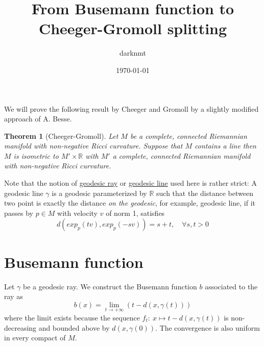 \documentclass[11pt]{article}
\author{darknmt}
\date{\today}
\title{From Busemann function to Cheeger-Gromoll splitting}
\newtheorem{theorem}{Theorem}
\begin{document}
\maketitle
\tableofcontents

\iffalse
\begin{info}
The PDF version of this page can be downloaded by replacing \texttt{html} in the its address by
\texttt{pdf}. 
For example \texttt{/html/sheaf-cohomology.html} should become \texttt{/pdf/sheaf-cohomology.pdf}.
\end{info}
\fi
\iffalse
\begin{info}
This post is a part of the \href{../res/Stage2017.pdf}{memoire of my M1 internship} at I2M. The memoire contains,
needless to say, less errors than this page.
\end{info}
\fi


We will prove the following result by Cheeger and Gromoll by a slightly modified approach of
A. Besse.


\begin{theorem}[Cheeger-Gromoll]
\label{org547c731}
\label{thm:cheeger-gromoll}
Let \(M\) be a complete, connected Riemannian manifold with non-negative Ricci curvature. Suppose
that \(M\) contains a line then \(M\) is isometric to \(M'\times \mathbb{R}\) with \(M'\) a complete,
connected Riemannian manifold with non-negative Ricci curvature.
\end{theorem}

Note that the notion of \uline{geodesic ray} or \uline{geodesic line} used here is rather strict: A geodesic
line \(\gamma\) is a geodesic parameterized by \(\mathbb{R}\) such that the distance between two point is
exactly the distance \emph{on the geodesic}, for example, geodesic line, if it passes by \(p\in M\) with
velocity \(v\) of norm 1, satisfies
\[
d(exp_p(tv), exp_p(-sv)) = s+t,\quad \forall s,t>0
\]


\section{Busemann function}
\label{sec:org3365e84}

Let \(\gamma\) be a geodesic ray. We construct the Busemann function \(b\) associated to the ray as
\[
b(x) = \lim_{t\to+\infty}\left( t - d(x,\gamma(t))\right)
\]
where the limit exists because the sequence \(f_t:\ x\mapsto t - d(x,\gamma(t))\) is non-decreasing and bounded above by
\(d(x,\gamma(0))\). The convergence is also uniform in every compact of \(M\). 
\end{document}
